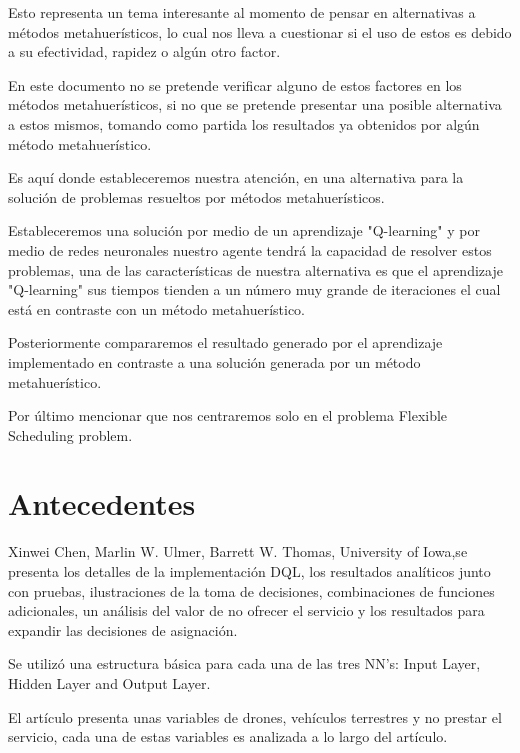 \documentclass[letterpaper, 10 pt]{article}
\begin{document}
Esto representa un tema interesante al momento de pensar en alternativas a métodos metahuerísticos, lo cual nos lleva a cuestionar si el uso de estos es debido a su efectividad, rapidez o algún otro factor.


En este documento no se pretende verificar alguno de estos factores en los métodos metahuerísticos, si no que se pretende presentar una posible alternativa a estos mismos, tomando como partida los resultados ya obtenidos por algún método metahuerístico.


Es aquí donde estableceremos nuestra atención, en una alternativa para la solución de problemas resueltos por métodos metahuerísticos.

Estableceremos una solución por medio de un aprendizaje "Q-learning" y por medio de redes neuronales nuestro agente tendrá la capacidad de resolver estos problemas, una de las características de nuestra alternativa es que el aprendizaje "Q-learning" sus tiempos tienden a un número muy grande de iteraciones el cual está en contraste con un método metahuerístico.

Posteriormente compararemos el resultado generado por el aprendizaje implementado en contraste a una solución generada por un método metahuerístico.

Por último mencionar que nos centraremos  solo en el problema  Flexible Scheduling problem.

\section*{Antecedentes}
Xinwei Chen, Marlin W. Ulmer, Barrett W. Thomas, University of Iowa,se presenta los detalles de la implementación DQL, los resultados analíticos junto con pruebas, ilustraciones de la toma de decisiones, combinaciones de funciones adicionales, un análisis del valor de no ofrecer el servicio y los resultados para expandir las decisiones de asignación.


Se utilizó una estructura básica para cada una de las tres NN's: Input Layer, Hidden Layer and Output Layer.

El artículo presenta unas variables de drones, vehículos terrestres y no prestar el servicio, cada una de estas variables es analizada a lo largo del artículo.
\end{document}
